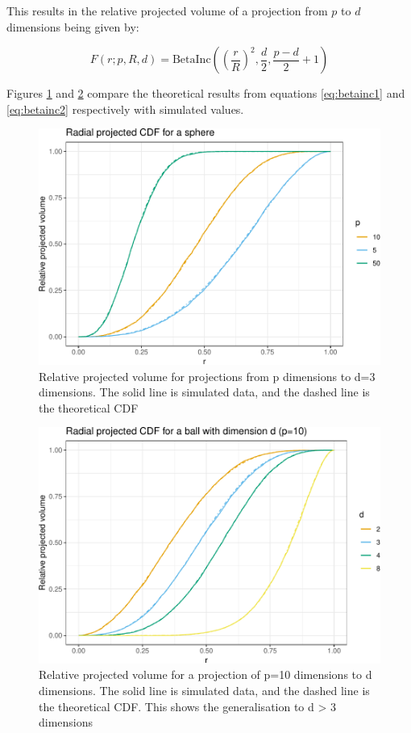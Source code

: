 This results in the relative projected volume of a projection from \(p\) to \(d\) dimensions being given by:

\begin{equation}
F(r; p, R, d) = \mathrm{BetaInc}\left(\left(\frac{r}{R}\right)^2, \frac{d}{2}, \frac{p-d}{2}+1\right)
\label{eq:betainc2}
\end{equation}

Figures \ref{fig:radial-cdf-p} and \ref{fig:radial-cdf-d} compare the theoretical results from equations \eqref{eq:betainc1} and \eqref{eq:betainc2} respectively with simulated values.

\begin{figure}

{\centering \includegraphics[width=0.75\linewidth]{detourr_files/figure-latex/radial-cdf-p-1} 

}

\caption{Relative projected volume for projections from p dimensions to d=3 dimensions. The solid line is simulated data, and the dashed line is the theoretical CDF}\label{fig:radial-cdf-p}
\end{figure}

\begin{figure}

{\centering \includegraphics[width=0.75\linewidth]{detourr_files/figure-latex/radial-cdf-d-1} 

}

\caption{Relative projected volume for a projection of p=10 dimensions to d dimensions.  The solid line is simulated data, and the dashed line is the theoretical CDF. This shows the generalisation to d > 3 dimensions}\label{fig:radial-cdf-d}
\end{figure}

